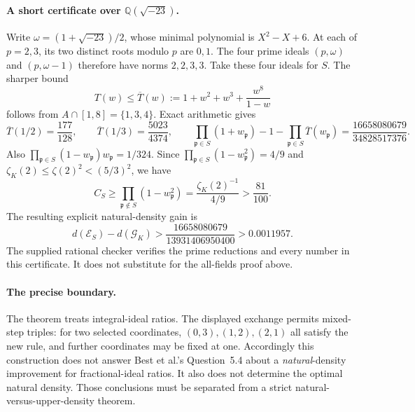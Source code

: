 \paragraph{A short certificate over $\mathbb Q(\sqrt{-23})$.}
Write $\omega=(1+\sqrt{-23})/2$, whose minimal polynomial is
$X^2-X+6$. At each of $p=2,3$, its two distinct roots modulo $p$ are
$0,1$. The four prime ideals $(p,\omega)$ and $(p,\omega-1)$ therefore
have norms $2,2,3,3$. Take these four ideals for $S$.
The sharper bound
\[
                T(w)\le\overline T(w):=1+w^2+w^3+\frac{w^8}{1-w}
\]
follows from $A\cap[1,8]=\{1,3,4\}$. Exact arithmetic gives
\[
 \overline T(1/2)=\frac{177}{128},\qquad
 \overline T(1/3)=\frac{5023}{4374},\qquad
 \prod_{\mathfrak p\in S}(1+w_{\mathfrak p})-1
       -\prod_{\mathfrak p\in S}\overline T(w_{\mathfrak p})
       =\frac{16658080679}{34828517376}.
\]
Also $\prod_{\mathfrak p\in S}(1-w_{\mathfrak p})w_{\mathfrak p}=1/324$.
Since $\prod_{\mathfrak p\in S}(1-w_{\mathfrak p}^2)=4/9$ and
$\zeta_K(2)\le\zeta(2)^2<(5/3)^2$, we have
\[
 C_S\ge\prod_{\mathfrak p\notin S}(1-w_{\mathfrak p}^2)
       =\frac{\zeta_K(2)^{-1}}{4/9}>\frac{81}{100}.
\]
The resulting explicit natural-density gain is
\begin{equation}\label{eq:ideal-natural-23-gain}
 d(\mathcal E_S)-d(\mathcal G_K)
 >\frac{16658080679}{13931406950400}>0.0011957.
\end{equation}
The supplied rational checker verifies the prime reductions and every
number in this certificate. It does not substitute for the all-fields
proof above.

\paragraph{The precise boundary.}
The theorem treats integral-ideal ratios. The displayed exchange permits
mixed-step triples: for two selected coordinates, $(0,3),(1,2),(2,1)$
all satisfy the new rule, and further coordinates may be fixed at one.
Accordingly this construction does not answer Best et al.'s Question~5.4
about a \emph{natural}-density improvement for fractional-ideal ratios.
It also does not determine the optimal natural density. Those conclusions
must be separated from a strict natural-versus-upper-density theorem.
